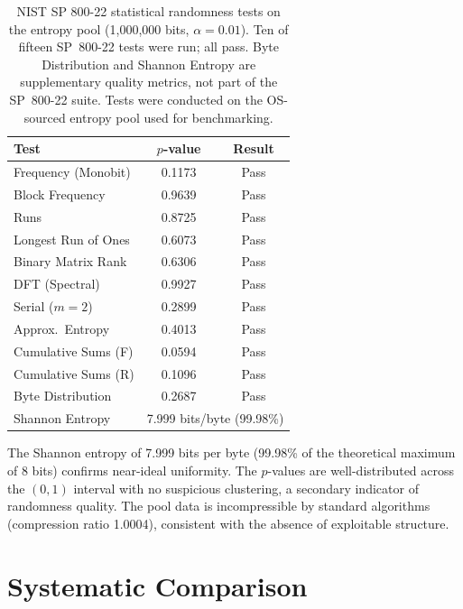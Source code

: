 \documentclass[journal]{IEEEtran}
\begin{document}
\begin{table}[t]
\caption{NIST SP 800-22 statistical randomness tests on the entropy pool (1,000,000 bits, $\alpha = 0.01$). Ten of fifteen SP~800-22 tests were run; all pass. Byte Distribution and Shannon Entropy are supplementary quality metrics, not part of the SP~800-22 suite. Tests were conducted on the OS-sourced entropy pool used for benchmarking.}
\label{tab:nist}
\begin{center}
\begin{tabular}{@{}lcc@{}}
\toprule
\textbf{Test} & \textbf{$p$-value} & \textbf{Result} \\
\midrule
Frequency (Monobit) & 0.1173 & Pass \\
Block Frequency     & 0.9639 & Pass \\
Runs                & 0.8725 & Pass \\
Longest Run of Ones & 0.6073 & Pass \\
Binary Matrix Rank  & 0.6306 & Pass \\
DFT (Spectral)      & 0.9927 & Pass \\
Serial ($m{=}2$)    & 0.2899 & Pass \\
Approx.\ Entropy    & 0.4013 & Pass \\
Cumulative Sums (F) & 0.0594 & Pass \\
Cumulative Sums (R) & 0.1096 & Pass \\
Byte Distribution   & 0.2687 & Pass \\
\midrule
Shannon Entropy     & \multicolumn{2}{c}{7.999 bits/byte (99.98\%)} \\
\bottomrule
\end{tabular}
\end{center}
\end{table}

The Shannon entropy of 7.999 bits per byte (99.98\% of the theoretical maximum of 8 bits) confirms near-ideal uniformity. The $p$-values are well-distributed across the $(0,1)$ interval with no suspicious clustering, a secondary indicator of randomness quality. The pool data is incompressible by standard algorithms (compression ratio 1.0004), consistent with the absence of exploitable structure.

\section{Systematic Comparison}
\label{sec:comparison}
\end{document}

